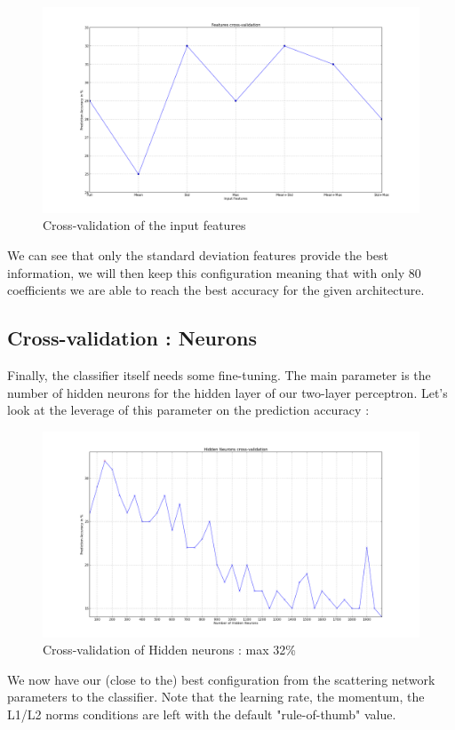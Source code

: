 \documentclass[a4paper]{report}
\begin{document}
\begin{figure}[H]
\begin{center}
\includegraphics[scale=0.2]{features_cross_S0.png}\caption{Cross-validation of the input features}\label{figure4}
\end{center}
\end{figure}
We can see that only the standard deviation features provide the best information, we will then keep this configuration meaning that with only $80$ coefficients we are able to reach the best accuracy for the given architecture.
\subsection{Cross-validation : Neurons}
Finally, the classifier itself needs some fine-tuning. The main parameter is the number of hidden neurons for the hidden layer of our two-layer perceptron.
Let's look at the leverage of this parameter on the prediction accuracy :
\begin{figure}[H]
\begin{center}
\includegraphics[scale=0.20]{hidden_S0.png}\caption{Cross-validation of Hidden neurons : max 32\%}\label{figure4}
\end{center}
\end{figure}
We now have our (close to the) best configuration from the scattering network parameters to the classifier. Note that the learning rate, the momentum, the L1/L2 norms conditions are left with the default "rule-of-thumb" value.
\end{document}

